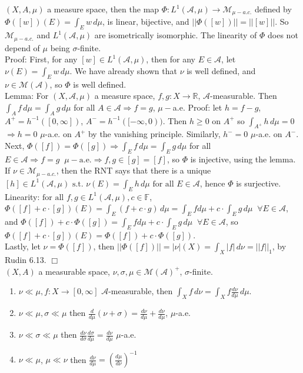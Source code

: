 \documentclass[12pt]{article}
\newcommand{\st}[0]{ \textrm{ s.t. } }
\newcommand{\fall}[0] { \textrm{ for all } }
\newcommand{\aew}[0] { \textrm{a.e.} }
\newcommand{\rimply}[0] { \Rightarrow }
\newcommand{\rarw}[0] { \rightarrow }
\newcommand{\reals}[0] { \mathbb{R}}
\newcommand{\A}[0] { \mathcal{A} }
\newcommand{\M}[0] { \mathcal{M} }
\begin{document}
$(X, A, \mu)$ a measure space, then the map $\Phi: L^1(\A, \mu) \rarw \M_{\mu-a.c.}$ defined by $\Phi([w])(E) = \int_E w\, d\mu$, is linear, bijective, and $|| \Phi([w]) || = ||[w]||$. So $\M_{\mu-a.c.}$ and $L^1(\A, \mu)$ are isometrically isomorphic. The linearity of $\Phi$ does not depend of $\mu$ being $\sigma$-finite.\\

\noindent
Proof: First, for any $[w] \in L^1(\A, \mu)$, then for any $E \in \A$, let $\nu(E) = \int_E w \, d\mu$. We have already shown that $\nu$ is well defined, and $\nu \in \M(\A)$, so $\Phi$ is well defined. \\

\noindent
Lemma: For $(X, \A, \mu)$ a measure space, $f,g: X \rarw \reals$, $\A$-measurable. Then $ \int_A f \,d\mu = \int_A g \, d\mu$ for all $A \in \A \rimply f = g$, $\mu-$a.e. Proof: let $h = f - g$, $A^+ = h^{-1}( [0,\infty] )$, $A^- = h^{-1}( [-\infty,0) )$. Then $h \ge 0$ on $A^+$ so $\int_{A^+} h \,d\mu = 0$ $\rimply h=0$ $\mu$-a.e. on $A^+$ by the vanishing principle. Similarly, $h^- = 0$ $\mu$-a.e. on $A^-$. \\

\noindent
Next, $\Phi([f]) = \Phi([g]) \rimply \int_E f \, d\mu = \int_E g \, d\mu$ for all $E \in \A \rimply f=g \; \;\mu-\aew \rimply f,g \in [g] = [f]$, so $\Phi$ is injective, using the lemma. If $\nu \in \M_{\mu-a.c.}$, then the RNT says that there is a unique $[h] \in L^1(\A, \mu)  \st \nu(E) = \int_E h \, d\mu  \fall E \in \A $, hence $\Phi$ is surjective. \\

\noindent
Linearity:$\fall f,g \in L^1(\A, \mu), c \in \mathbb{F}$,  $\Phi([f] + c \cdot [g])(E) = \int_E \left( f + c \cdot g \right) \, d\mu = \int_E f d\mu + c \cdot \int_E g  \, d\mu \; \; \forall E \in \A$, and 
 $\Phi([f]) + c \cdot \Phi([g]) = \int_E f d\mu + c \cdot \int_E g  \, d\mu \; \; \forall E \in \A$, so 
 $ \Phi([f] + c \cdot [g])(E) = \Phi([f]) + c \cdot \Phi([g])$. \\
 
\noindent
Lastly, let $ \nu = \Phi([f])$, then $||\Phi([f])|| = |\nu|(X) = \int_X |f| \, d\nu = ||f||_1$, by Rudin 6.13. $\Box$ \\






$(X, A)$ a measurable space, $\nu,\sigma,\mu \in \M(\A)^+$, $\sigma$-finite.

\begin{enumerate}
\item
$\nu \ll \mu, f: X \rarw [0,\infty]$ $\A$-measurable, then $\int_X f \, d\nu = \int_X f \frac{d\nu}{d\mu} \, d\mu$.
\item
$\nu \ll \mu, \sigma \ll \mu$ then $\frac{d}{d\mu}( \nu + \sigma ) = \frac{d\nu}{d\mu} +  \frac{d\nu}{d\mu}$, $\mu$-a.e.
\item
$\nu \ll \sigma \ll \mu$ then $\frac{d\nu}{d\sigma}\frac{d\sigma}{d\mu} = \frac{d\nu}{d\mu}$ $\mu$-a.e.
\item
$\nu \ll \mu$, $\mu \ll \nu$ then $\frac{d\nu}{d\mu} = \left( \frac{d\mu}{d\nu} \right)^{-1} $
\end{enumerate}
\end{document}
